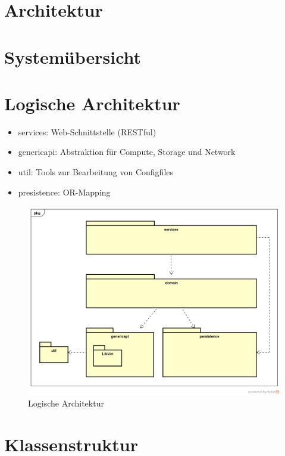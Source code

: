 \newpage
\section{Architektur}

\section{Systemübersicht}

\section{Logische Architektur}
\begin{itemize}
	\item services: Web-Schnittstelle (RESTful)
	\item genericapi: Abstraktion für Compute, Storage und Network
	\item util: Tools zur Bearbeitung von Configfiles
	\item presistence: OR-Mapping
\end{itemize}

\begin{figure}[!htbp]
\includegraphics[width=\textwidth]{./05_Design/04_Architektur/LogischeSicht}
\caption{Logische Architektur}
\end{figure}

\newpage

\section{Klassenstruktur}

